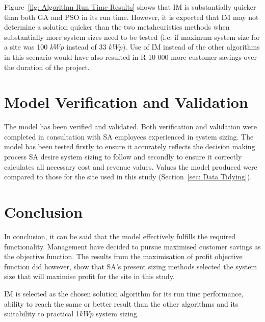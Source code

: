 \documentclass[a4paper,11pt,fleqn]{report}
\begin{document}
Figure~\ref{fig: Algorithm Run Time Results} shows that \ac{IM} is substantially quicker than both \ac{GA} and \ac{PSO} in its run time. However, it is expected that \ac{IM} may not determine a solution quicker than the two metaheuristics methods when substantially more system sizes need to be tested (i.e. if maximum system size for a site was 100 $kWp$ instead of 33 $kWp$). Use of \ac{IM} instead of the other algorithms in this scenario would have also resulted in R 10 000 more customer savings over the duration of the project.

\section{Model Verification and Validation}  \label{sec: Model Validation and Expansion}
The model has been verified and validated. Both verification and validation were completed in consultation with \ac{SA} employees experienced in system sizing. The model has been tested firstly to ensure it accurately reflects the decision making process \ac{SA} desire system sizing to follow and secondly to ensure it correctly calculates all necessary cost and revenue values. Values the model produced were compared to those for the site used in this study (Section~\ref{sec: Data Tidying}).

\section{Conclusion}
In conclusion, it can be said that the model effectively fulfills the required functionality. Management have decided to pursue maximised customer savings as the objective function. The results from the maximisation of profit objective function did however, show that \ac{SA}'s present sizing methods selected the system size that will maximise profit for the site in this study.

\ac{IM} is selected as the chosen solution algorithm for its run time performance, ability to reach the same or better result than the other algorithms and its suitability to practical 1$kWp$ system sizing. 

%
\end{document}
